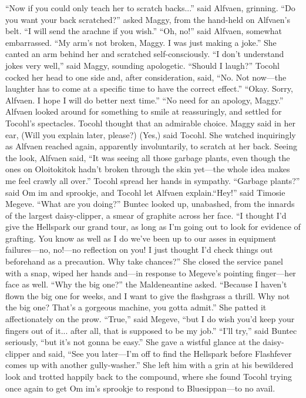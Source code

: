 \documentclass[9pt]{article}
\begin{document}
“Now if you could only teach her to scratch backs...” said Alfvaen, grinning.
“Do you want your back scratched?” asked Maggy, from the hand-held on Alfvaen’s belt. “I will
send the arachne if you wish.”
“Oh, no!” said Alfvaen, somewhat embarrassed. “My arm’s not broken, Maggy. I was just making a
joke.” She canted an arm behind her and scratched self-consciously.
“I don’t understand jokes very well,” said Maggy, sounding apologetic. “Should I laugh?”
Tocohl cocked her head to one side and, after consideration, said, “No. Not now—the laughter has
to come at a specific time to have the correct effect.”
“Okay. Sorry, Alfvaen. I hope I will do better next time.”
“No need for an apology, Maggy.” Alfvaen looked around for something to smile at reassuringly, and
settled for Tocohl’s spectacles. Tocohl thought that an admirable choice.
Maggy said in her ear, (Will you explain later, please?)
(Yes,) said Tocohl. She watched inquiringly as Alfvaen reached again, apparently involuntarily, to
scratch at her back.
Seeing the look, Alfvaen said, “It was seeing all those garbage plants, even though the ones on
Oloitokitok hadn’t broken through the skin yet—the whole idea makes me feel crawly all over.”
Tocohl spread her hands in sympathy.
“Garbage plants?” said Om im and sprookje, and Tocohl let Alfvaen explain.“Hey!” said Timosie Megeve. “What are you doing?”
Buntec looked up, unabashed, from the innards of the largest daisy-clipper, a smear of graphite
across her face.
“I thought I’d give the Hellspark our grand tour, as long as I’m going out to look for evidence of
grafting. You know as well as I do we’ve been up to our asses in equipment failures—no, no!—no
reflection on you! I just thought I’d check things out beforehand as a precaution. Why take chances?”
She closed the service panel with a snap, wiped her hands and—in response to Megeve’s pointing
finger—her face as well.
“Why the big one?” the Maldeneantine asked.
“Because I haven’t flown the big one for weeks, and I want to give the flashgrass a thrill. Why not
the big one? That’s a gorgeous machine, you gotta admit.” She patted it affectionately on the prow.
“True,” said Megeve, “but I do wish you’d keep your fingers out of it... after all, that is supposed to
be my job.”
“I’ll try,” said Buntec seriously, “but it’s not gonna be easy.” She gave a wistful glance at the
daisy-clipper and said, “See you later—I’m off to find the Hellspark before Flashfever comes up with
another gully-washer.”
She left him with a grin at his bewildered look and trotted happily back to the compound, where she
found Tocohl trying once again to get Om im’s sprookje to respond to Bluesippan—to no avail.
\end{document}
